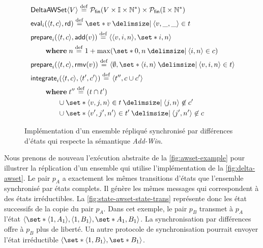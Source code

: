 \begin{figure}[bth]
\centering
\begin{align}
&\trm{DeltaAWSet}\tuple*{V} \defeq \powerfset{V \times \mathbb{I} \times \mathbb{N}^*} \times \powerfset{\mathbb{I} \times \mathbb{N}^*} \label{eq:delta-awset-state}\\
&\trm{eval}_i(\tuple*{t, c}, \trm{rd}) \defeq \set*{v \given \tuple*{v, \_, \_} \in t} \label{eq:delta-awset-eval}\\
&\begin{aligned}
\MoveEqLeft\trm{prepare}_i(\tuple*{t, c}, \trm{add}(v)) \defeq \tuple*{\tuple*{v, i, n},\set*{i, n}}\\
    &\where n \defeq 1 + \max(\set*{0,n \given \tuple*{i, n} \in c})
\end{aligned}\label{eq:delta-awset-prep-add}\\
&\trm{prepare}_i(\tuple*{t, c}, \trm{rmv}(v)) \defeq \tuple*{\emptyset, \set*{\tuple*{i, n} \given \tuple*{v, i, n} \in t}}\label{eq:delta-awset-prep-rmv}\\
&\begin{aligned}
\MoveEqLeft \trm{integrate}_i(\tuple*{t, c}, \tuple*{t', c'}) \defeq \tuple*{t'', c \cup c'}\\
    &\begin{aligned}
    \MoveEqLeft\where t'' \defeq (t \cap t')\\
    &\cup \set*{\tuple*{v, j, n} \in t \given \tuple*{j, n} \not\in c'}\\
    &\cup \set*{\tuple*{v', j', n'} \in t' \given \tuple*{j', n'} \not\in c}
    \end{aligned}
\end{aligned}\label{eq:delta-awset-integr}
\end{align}
\caption[Implémentation d'un ensemble répliqué synchronisé par différences d'états]{Implémentation d'un ensemble répliqué synchronisé par différences d'états qui respecte la sémantique \emph{Add-Win}.}\label{fig:delta-awset}
\end{figure}

Nous prenons de nouveau l'exécution abstraite de la \autoref{fig:awset-example} pour illustrer la réplication d'un ensemble qui utilise l'implémentation de la \autoref{fig:delta-awset}.
Le pair $p_A$ a exactement les mêmes transitions d'états que l'ensemble synchronisé par états complets.
Il génère les mêmes messages qui correspondent à des états irréductibles.
La \autoref{fig:state-awset-state-trans} représente donc les état successifs de la copie du pair $p_A$.
Dans cet exemple, le pair $p_B$ transmet à $p_A$ l'état $\tuple*{\set*{\tuple*{1,A_1},\tuple*{1,B_1}},\set*{A_1,B_1}}$.
La synchronisation par différences offre à $p_B$ plus de liberté.
Un autre protocole de synchronisation pourrait envoyer l'état irréductible $\tuple*{\set*{\tuple*{1,B_1}},\set*{B_1}}$.

